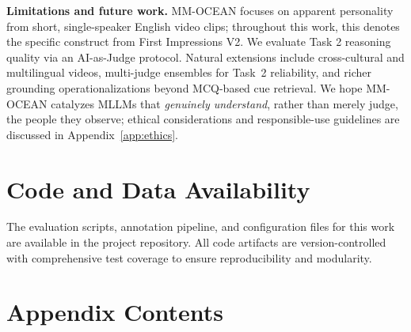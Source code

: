 \documentclass{article}
\newcommand{\benchname}{MM-OCEAN}
\begin{document}
\noindent\textbf{Limitations and future work.}
\benchname{} focuses on apparent personality from short, single-speaker English video clips; throughout this work, this denotes the specific construct from First Impressions V2. We evaluate Task 2 reasoning quality via an AI-as-Judge protocol. 
Natural extensions include cross-cultural and multilingual videos, multi-judge ensembles for Task~2 reliability, and richer grounding operationalizations beyond MCQ-based cue retrieval. We hope \benchname{} catalyzes MLLMs that \emph{genuinely understand}, rather than merely judge, the people they observe; ethical considerations and responsible-use guidelines are discussed in Appendix~\ref{app:ethics}.


\section*{Code and Data Availability}

The evaluation scripts, annotation pipeline, and configuration files for this work are available in the project repository. All code artifacts are version-controlled with comprehensive test coverage to ensure reproducibility and modularity.



\newpage
\appendix
\setcounter{figure}{0}
\setcounter{table}{0}
\renewcommand{\thefigure}{A\arabic{figure}}
\renewcommand{\thetable}{A\arabic{table}}

\newcommand{\tocrow}[3]{\textbf{\S\ref{#1}~~#2} & \textcolor{tocdesc}{#3} \\}
\newcommand{\tocgroup}[1]{\addlinespace[6pt]\multicolumn{2}{@{}l}{\textcolor{tocgrouph}{\textsc{\textbf{#1}}}} \\[2pt]}

\section*{Appendix Contents}
\label{app:toc}
\end{document}
